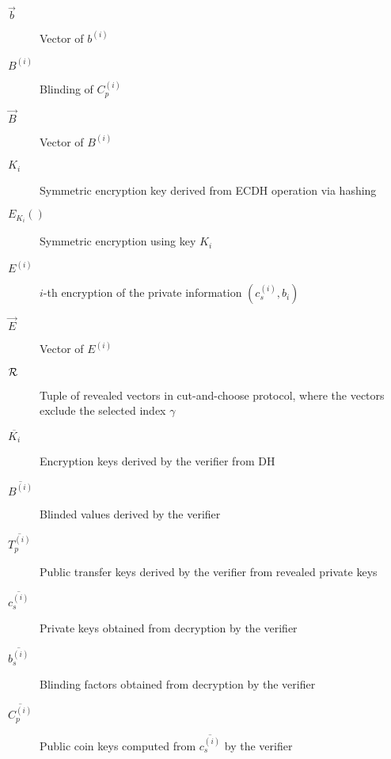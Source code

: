 \documentclass{llncs}
\begin{document}
\begin{description}
  \item[$\vec{b}$]{Vector of $b^{(i)}$}
  \item[$B^(i)$]{Blinding of $C_p^{(i)}$}
  \item[$\vec{B}$]{Vector of $B^{(i)}$}
  \item[$K_i$]{Symmetric encryption key derived from ECDH operation via hashing}
  \item[$E_{K_i}()$]{Symmetric encryption using key $K_i$}
  \item[$E^{(i)}$]{$i$-th encryption of the private information $(c_s^{(i)}, b_i)$}
  \item[$\vec{E}$]{Vector of $E^{(i)}$}
  \item[$\cal{R}$]{Tuple of revealed vectors in cut-and-choose protocol,
    where the vectors exclude the selected index $\gamma$}
  \item[$\overline{K_i}$]{Encryption keys derived by the verifier from DH}
  \item[$\overline{B^{(i)}}$]{Blinded values derived by the verifier}
  \item[$\overline{T_p^{(i)}}$]{Public transfer keys derived by the verifier from revealed private keys}
  \item[$\overline{c_s^{(i)}}$]{Private keys obtained from decryption by the verifier}
  \item[$\overline{b_s^{(i)}}$]{Blinding factors obtained from decryption by the verifier}
  \item[$\overline{C^{(i)}_p}$]{Public coin keys computed from $\overline{c_s^{(i)}}$ by the verifier}
\end{description}
\end{document}
